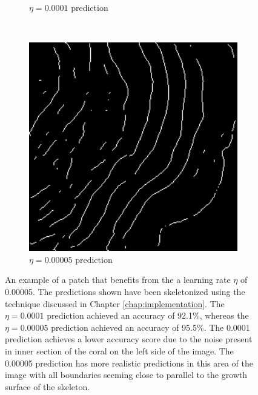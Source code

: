 \begin{figure}[!t]
\begin{subfigure}[t]{0.32\textwidth}
        \caption{$\eta=0.0001$ prediction}
    \end{subfigure}
    ~
    \begin{subfigure}[t]{0.32\textwidth}
        \centering
        \includegraphics[width=1\textwidth, valign=c]{images/5e5-example.png}
        \caption{$\eta=0.00005$ prediction}
    \end{subfigure}
    \caption{An example of a patch that benefits from the a learning rate $\eta$ of 0.00005. The predictions shown have been skeletonized using the technique discussed in Chapter \ref{chap:implementation}. The $\eta=0.0001$ prediction achieved an accuracy of 92.1\%, whereas the $\eta=0.00005$ prediction achieved an accuracy of 95.5\%. The 0.0001 prediction achieves a lower accuracy score due to the noise present in inner section of the coral on the left side of the image. The 0.00005 prediction has more realistic predictions in this area of the image with all boundaries seeming close to parallel to the growth surface of the skeleton.}
    \label{fig:lrdiff}
\end{figure}

